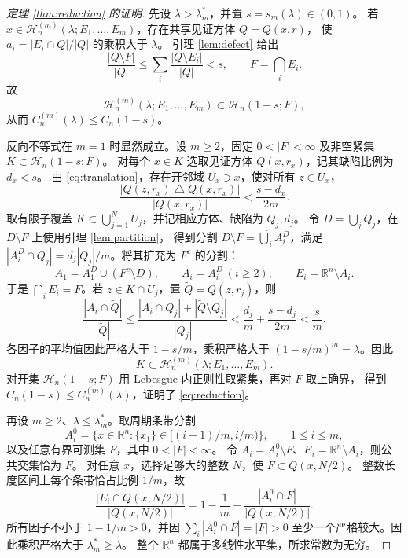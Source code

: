 \documentclass[UTF8,11pt,fontset=none]{ctexart}
\theoremstyle{remark}
\newcommand{\R}{\mathbb R}
\newcommand{\Hc}{\mathcal H_n}
\newcommand{\Hm}{\mathcal H_n^{(m)}}
\newcommand{\Cn}{C_n}
\newcommand{\Cm}{C_n^{(m)}}
\begin{document}
\begin{proof}[定理 \ref{thm:reduction} 的证明]
先设 \(\lambda>\lambda_m^*\)，并置 \(s=s_m(\lambda)\in(0,1)\)。
若 \(x\in\Hm(\lambda;E_1,\ldots,E_m)\)，存在共享见证方体 \(Q=Q(x,r)\)，
使 \(a_i=|E_i\cap Q|/|Q|\) 的乘积大于 \(\lambda\)。
引理 \ref{lem:defect} 给出
\[
 \frac{|Q\setminus F|}{|Q|}
 \le\sum_i\frac{|Q\setminus E_i|}{|Q|}<s,
 \qquad F=\bigcap_iE_i.
\]
故
\begin{equation}\label{eq:haloinclusion}
 \Hm(\lambda;E_1,\ldots,E_m)\subset\Hc(1-s;F),
\end{equation}
从而 \(\Cm(\lambda)\le\Cn(1-s)\)。

反向不等式在 \(m=1\) 时显然成立。设 \(m\ge2\)，固定
\(0<|F|<\infty\) 及非空紧集 \(K\subset\Hc(1-s;F)\)。
对每个 \(x\in K\) 选取见证方体 \(Q(x,r_x)\)，记其缺陷比例为 \(d_x<s\)。
由 \eqref{eq:translation}，存在开邻域 \(U_x\ni x\)，使对所有 \(z\in U_x\)，
\[
 \frac{|Q(z,r_x)\mathbin\triangle Q(x,r_x)|}{|Q(x,r_x)|}
 <\frac{s-d_x}{2m}.
\]
取有限子覆盖 \(K\subset\bigcup_{j=1}^NU_j\)，并记相应方体、缺陷为 \(Q_j,d_j\)。
令 \(D=\bigcup_jQ_j\)，在 \(D\setminus F\) 上使用引理 \ref{lem:partition}，
得到分割 \(D\setminus F=\dot\bigcup_iA_i^D\)，满足
\(|A_i^D\cap Q_j|=d_j|Q_j|/m\)。将其扩充为 \(F^c\) 的分割：
\[
 A_1=A_1^D\cup(F^c\setminus D),\qquad
 A_i=A_i^D\ (i\ge2),\qquad E_i=\R^n\setminus A_i.
\]
于是 \(\bigcap_iE_i=F\)。若 \(z\in K\cap U_j\)，置 \(\widetilde Q=Q(z,r_j)\)，则
\[
 \frac{|A_i\cap\widetilde Q|}{|\widetilde Q|}
 \le\frac{|A_i\cap Q_j|+|\widetilde Q\setminus Q_j|}{|Q_j|}
 <\frac{d_j}{m}+\frac{s-d_j}{2m}<\frac{s}{m}.
\]
各因子的平均值因此严格大于 \(1-s/m\)，乘积严格大于
\((1-s/m)^m=\lambda\)。因此
\[
 K\subset\Hm(\lambda;E_1,\ldots,E_m).
\]
对开集 \(\Hc(1-s;F)\) 用 Lebesgue 内正则性取紧集，再对 \(F\) 取上确界，
得到 \(\Cn(1-s)\le\Cm(\lambda)\)，证明了 \eqref{eq:reduction}。

再设 \(m\ge2\)、\(\lambda\le\lambda_m^*\)。取周期条带分割
\[
 A_i^0=\{x\in\R^n:\{x_1\}\in[(i-1)/m,i/m)\},\qquad 1\le i\le m,
\]
以及任意有界可测集 \(F\)，其中 \(0<|F|<\infty\)。
令 \(A_i=A_i^0\setminus F\)、\(E_i=\R^n\setminus A_i\)，则公共交集恰为 \(F\)。
对任意 \(x\)，选择足够大的整数 \(N\)，使 \(F\subset Q(x,N/2)\)。
整数长度区间上每个条带恰占比例 \(1/m\)，故
\[
 \frac{|E_i\cap Q(x,N/2)|}{|Q(x,N/2)|}
 =1-\frac1m+\frac{|A_i^0\cap F|}{|Q(x,N/2)|}.
\]
所有因子不小于 \(1-1/m>0\)，并因 \(\sum_i|A_i^0\cap F|=|F|>0\)
至少一个严格较大。因此乘积严格大于 \(\lambda_m^*\ge\lambda\)。
整个 \(\R^n\) 都属于多线性水平集，所求常数为无穷。
\end{proof}
\end{document}
